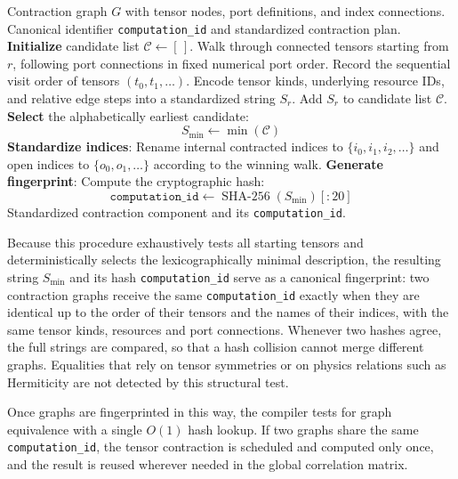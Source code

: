 \documentclass[a4paper,fleqn]{cas-dc}
\begin{document}
\begin{algorithm}[H]
\caption{Canonical Graph Isomorphism in \textsc{SymCorr}}
\label{alg:canonical_graph_isomorphism}
\begin{algorithmic}[1]
\Require Contraction graph \(G\) with tensor nodes, port definitions, and index connections.
\Ensure Canonical identifier \texttt{computation\_id} and standardized contraction plan.
\State \textbf{Initialize} candidate list \(\mathcal C \gets [\,]\).
    \State Walk through connected tensors starting from \(r\), following port connections in fixed numerical port order.
    \State Record the sequential visit order of tensors \((t_0, t_1, \ldots)\).
    \State Encode tensor kinds, underlying resource IDs, and relative edge steps into a standardized string \(S_r\).
    \State Add \(S_r\) to candidate list \(\mathcal C\).
\EndFor
\State \textbf{Select} the alphabetically earliest candidate:
\[ S_{\mathrm{min}} \gets \min(\mathcal C) \]
\State \textbf{Standardize indices}: Rename internal contracted indices to \(\{i_0, i_1, i_2, \dots\}\) and open indices to \(\{o_0, o_1, \dots\}\) according to the winning walk.
\State \textbf{Generate fingerprint}: Compute the cryptographic hash:
\[ \texttt{computation\_id} \gets \operatorname{SHA-256}(S_{\mathrm{min}})[:20] \]
\State \Return Standardized contraction component and its \texttt{computation\_id}.
\end{algorithmic}
\end{algorithm}

Because this procedure exhaustively tests all starting tensors and deterministically selects the lexicographically minimal description, the resulting string \(S_{\mathrm{min}}\) and its hash \texttt{computation\_id} serve as a canonical fingerprint: two contraction graphs receive the same \texttt{computation\_id} exactly when they are identical up to the order of their tensors and the names of their indices, with the same tensor kinds, resources and port connections. Whenever two hashes agree, the full strings are compared, so that a hash collision cannot merge different graphs. Equalities that rely on tensor symmetries or on physics relations such as Hermiticity are not detected by this structural test.

Once graphs are fingerprinted in this way, the compiler tests for graph equivalence with a single \(O(1)\) hash lookup. If two graphs share the same \texttt{computation\_id}, the tensor contraction is scheduled and computed only once, and the result is reused wherever needed in the global correlation matrix.
\end{document}
